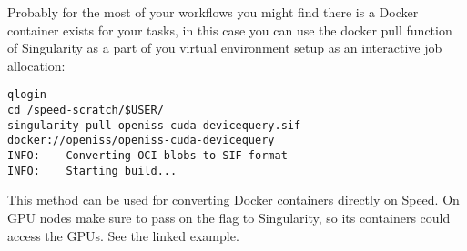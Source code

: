 Probably for the most of your workflows you might find there is a
Docker container exists for your tasks, in this case you
can use the docker pull function of Singularity as a part
of you virtual environment setup as an interactive job
allocation:

\small
\begin{verbatim}
qlogin
cd /speed-scratch/$USER/
singularity pull openiss-cuda-devicequery.sif docker://openiss/openiss-cuda-devicequery
INFO:    Converting OCI blobs to SIF format
INFO:    Starting build...
\end{verbatim}
\normalsize

\noindent
This method can be used for converting Docker containers directly on Speed.
On GPU nodes make sure to pass on the  flag to Singularity,
so its containers could access the GPUs. See the linked example.
